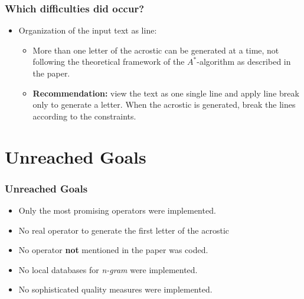 \documentclass{beamer}
\begin{document}
\begin{frame}
\frametitle{Which difficulties did occur?}
\begin{itemize}
	\item Organization of the input text as line:
	\begin{itemize}
		
		
		\item More than one letter of the acrostic can be generated at a time, not following the theoretical framework of the $A^*$-algorithm as described in the paper.
		
		\item \textbf{Recommendation:} view the text as one single line and apply
			line break only to generate a letter. When the acrostic is generated,
			break the lines according to the constraints.
	\end{itemize}
\end{itemize}
\end{frame}


\section{Unreached Goals}
\begin{frame}
\frametitle{Unreached Goals}
\begin{itemize}
	\item Only the most promising operators were implemented.
	\item No real operator to generate the first letter of the acrostic
	\item No operator \textbf{not} mentioned in the paper was coded.
	\item No local databases for \emph{n-gram} were implemented.
	\item No sophisticated quality measures were implemented.
\end{itemize}
\end{frame}



\end{document}
